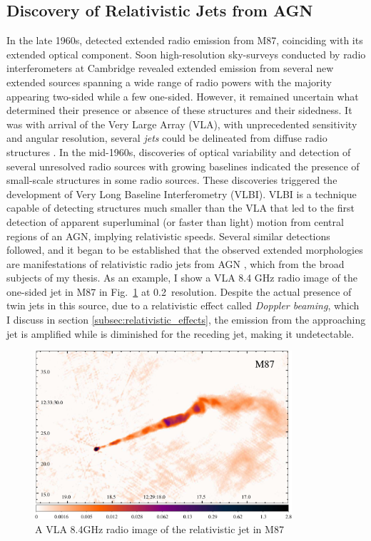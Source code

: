 \subsection{Discovery of Relativistic Jets from AGN}
In the late 1960s, \citet{hogg1969synthesis} detected extended radio emission from M87, coinciding with its extended optical component. Soon high-resolution sky-surveys conducted by radio interferometers at Cambridge revealed extended emission from several new extended sources spanning a wide range of radio powers \citep[e.g.,][]{1973MNRAS.165..369N,turland19753c} with the majority appearing two-sided while a few one-sided. However, it remained uncertain what determined their presence or absence of these structures and their sidedness. It was with arrival of the Very Large Array (VLA), with unprecedented sensitivity and angular resolution, several \textit{jets} could be delineated from diffuse radio structures \citep[e.g.,][]{bridle1984extragalactic}. In the mid-1960s, discoveries of optical variability and detection of several unresolved radio sources with growing baselines indicated the presence of small-scale structures in some radio sources. These discoveries triggered the development of Very Long Baseline Interferometry (VLBI). VLBI is a technique capable of detecting structures much smaller than the VLA that led to the first detection of apparent superluminal (or faster than light) motion from  \citep{whitney1971quasars,cohen1971small} central regions of an AGN, implying relativistic speeds. Several similar detections followed, and it began to be established that the observed extended morphologies are manifestations of relativistic radio jets from AGN \citep{blandford1979relativistic,konigl1980relativistic}, which from the broad subjects of my thesis. As an example, I show a VLA 8.4 GHz radio image of the one-sided jet in M87 in Fig.~\ref{fig:M87_showpiece} at 0.2\as~resolution. Despite the actual presence of twin jets in this source, due to a relativistic effect called \textit{Doppler beaming}, which I discuss in section \ref{subsec:relativistic_effects}, the emission from the approaching jet is amplified while is diminished for the receding jet, making it undetectable.

\begin{figure}
    \centering
    \includegraphics[width=0.849\textwidth]{images/misc/M87_thesis_showpeice-crop.pdf}
    \caption{A VLA 8.4GHz radio image of the relativistic jet in M87 \label{fig:M87_showpiece}}
\end{figure}

